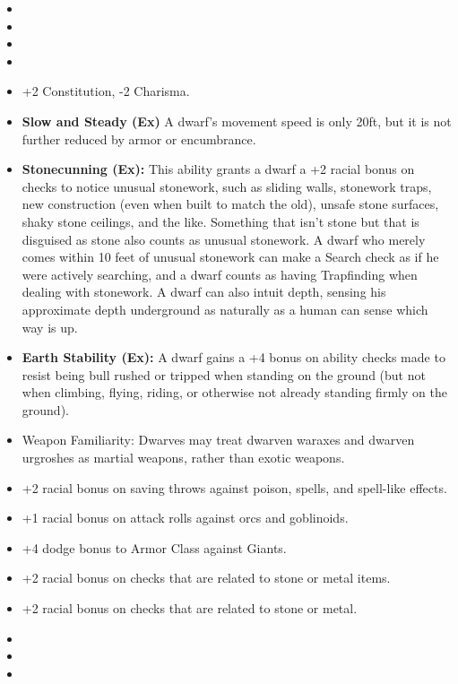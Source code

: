 

\begin{itemize}
\item {}
\item {}
\item {}
\item {}
\item +2 Constitution, -2 Charisma.
\item \textbf{Slow and Steady (Ex)} A dwarf's movement speed is only 20ft, but it is not further reduced by armor or encumbrance.
\item \textbf{Stonecunning (Ex):} This ability grants a dwarf a +2 racial bonus on  checks to notice unusual stonework, such as sliding walls, stonework traps, new construction (even when built to match the old), unsafe stone surfaces, shaky stone ceilings, and the like. Something that isn't stone but that is disguised as stone also counts as unusual stonework. A dwarf who merely comes within 10 feet of unusual stonework can make a Search check as if he were actively searching, and a dwarf counts as having Trapfinding when dealing with stonework. A dwarf can also intuit depth, sensing his approximate depth underground as naturally as a human can sense which way is up.
\item \textbf{Earth Stability (Ex):} A dwarf gains a +4 bonus on ability checks made to resist being bull rushed or tripped when standing on the ground (but not when climbing, flying, riding, or otherwise not already standing firmly on the ground).
\item Weapon Familiarity: Dwarves may treat dwarven waraxes and dwarven urgroshes as martial weapons, rather than exotic weapons.
\item +2 racial bonus on saving throws against poison, spells, and spell-like effects.
\item +1 racial bonus on attack rolls against orcs and goblinoids.
\item +4 dodge bonus to Armor Class against Giants.
\item +2 racial bonus on  checks that are related to stone or metal items.
\item +2 racial bonus on  checks that are related to stone or metal.
\item {}
\item {}
\item {}
\end{itemize}
